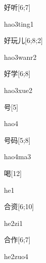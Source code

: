 \begin{verbete}{好听}[6;7]
\begin{pronuncia}{hao3ting1}
\end{pronuncia}
\end{verbete}

\begin{verbete}{好玩儿}[6;8;2]
\begin{pronuncia}{hao3wanr2}
\end{pronuncia}
\end{verbete}

\begin{verbete}{好学}[6;8]
\begin{pronuncia}{hao3xue2}
\end{pronuncia}
\end{verbete}

\begin{verbete}[hao4]{号}[5]
\begin{pronuncia}{hao4}
\end{pronuncia}
\end{verbete}

\begin{verbete}[hao4ma3]{号码}[5;8]
\begin{pronuncia}{hao4ma3}
\end{pronuncia}
\end{verbete}

\begin{verbete}[he1]{喝}[12]
\begin{pronuncia}{he1}
\end{pronuncia}
\end{verbete}

\begin{verbete}[he2zi1]{合资}[6;10]
\begin{pronuncia}{he2zi1}
\end{pronuncia}
\end{verbete}

\begin{verbete}[he2zuo4]{合作}[6;7]
\begin{pronuncia}{he2zuo4}
\end{pronuncia}
\end{verbete}

